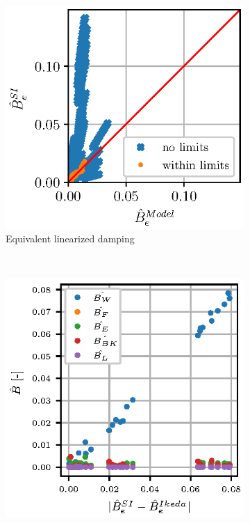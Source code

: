 \begin{figure}[H]
    \centering
    \begin{subfigure}[b]{0.48\textwidth}
        \centering
  
        \includegraphics[width=\textwidth]{figures/si_model_within.eps}
        \vspace{-0.5cm}
        \caption{Equivalent linearized damping}
        \label{fig:si_model_within}
    \end{subfigure}
        ~ %
    \begin{subfigure}[b]{0.48\textwidth}
        \centering
        \includegraphics[width=\textwidth]{figures/component_residual.eps}

\end{subfigure}
\end{figure}
